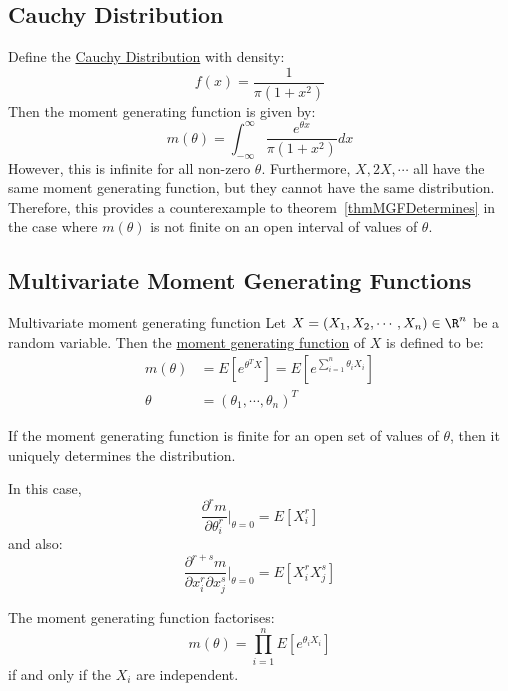 \documentclass[../Main.tex]{subfiles}
\begin{document}
\subsection{Cauchy Distribution}
Define the \underline{Cauchy Distribution} with density:
\begin{equation*}
    f(x) = \frac{1}{\pi (1 + x^2)}
\end{equation*}
Then the moment generating function is given by:
\begin{equation*}
    m(\theta) = \int_{-\infty}^\infty \frac{e^{\theta x}}{\pi(1 + x^2)}dx
\end{equation*}
However, this is infinite for all non-zero $\theta$. Furthermore, $X, 2X, \cdots$ all have the same moment generating function, but they cannot have the same distribution. Therefore, this provides a counterexample to theorem~\ref{thmMGFDetermines} in the case where $m(\theta)$ is not finite on an open interval of values of $\theta$.
\subsection{Multivariate Moment Generating Functions} %
\begin{definition}{Multivariate moment generating function}
    Let $X = (X_1, X_2, \cdots, X_n) \in \R^n$ be a random variable. Then the \underline{moment generating function} of $X$ is defined to be:
    \begin{align*}
        m(\theta) &= E[e^{\theta^T X}] = E[e^{\sum_{i=1}^n \theta_i X_i}] \\
        \theta &= (\theta_1, \cdots, \theta_n)^T
    \end{align*}
\end{definition}
\begin{theorem}
    If the moment generating function is finite for an open set of values of $\theta$, then it uniquely determines the distribution.

    In this case,
    \begin{equation*}
        \frac{\partial^r m}{\partial \theta_i^r} \vert_{\theta = 0} = E[X_i^r]
    \end{equation*}
    and also:
    \begin{equation*}
        \frac{\partial^{r + s}m}{\partial x_i^r \partial x_j^s} \vert_{\theta = 0} = E[X_i^r X_j^s]
    \end{equation*}
    \label{thmMGFMultiVarDetermines}
\end{theorem}
\begin{proposition}
    The moment generating function factorises:
    \begin{equation*}
        m(\theta) = \prod_{i = 1}^n E[e^{\theta_i X_i}]
    \end{equation*}
    if and only if the $X_i$ are independent.
    \label{propMGFMultiVarFactorise}
\end{proposition}
\end{document}

